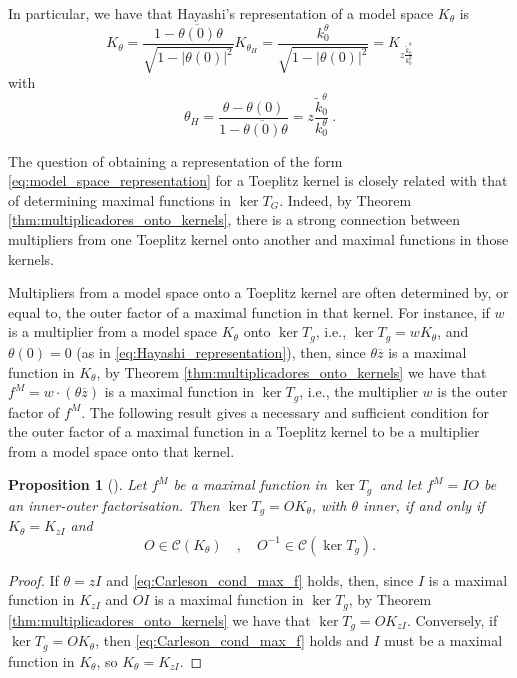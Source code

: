\documentclass{article}
\numberwithin{equation}{section}
\theoremstyle{plain}
\newtheorem{prop}[thm]{Proposition}
\newcommand{\CCC}{\ensuremath{\mathcal{C}}}
\newcommand{\ol}[1]{\ensuremath{\overline{#1}}}
\newcommand{\kertg}{\ensuremath{\ker T_g}}
\begin{document}
In particular, we have that Hayashi's representation of a model space $K_\theta$ is
\begin{equation}
\label{eq:Hayashi_repres_modelspace}
K_\theta = \frac{1 - \ol{ \theta (0) } \theta}{\sqrt{1 - |\theta(0)|^2}} K_{\theta_H} = \frac{k_0^\theta}{\sqrt{1 - |\theta(0)|^2}} = K_{z \frac{\tilde k^\theta_0}{k^\theta_0}}
\end{equation}
with 
\begin{equation}
\theta_H = \frac{\theta - \theta(0)}{1 - \ol{ \theta (0) } \theta} = z \frac{\tilde k^\theta_0}{k^\theta_0}\ .
\end{equation}


The question of obtaining a representation of the form \eqref{eq:model_space_representation} for a Toeplitz kernel is closely related with that of determining maximal functions in $\ker T_G$. Indeed, by Theorem \ref{thm:multiplicadores_onto_kernels}, there is a strong connection between multipliers from one Toeplitz kernel onto another and maximal functions in those kernels.


Multipliers from a model space onto a Toeplitz kernel are often determined by, or equal to, the outer factor of a maximal function in that kernel.
For instance, if $w$ is a multiplier from a model space $K_\theta$ onto \kertg, i.e., $\kertg = w K_\theta$, and $\theta(0) =0$ (as in \eqref{eq:Hayashi_representation}), then, since $\theta \ol z$ is a maximal function in $K_\theta$, by Theorem \ref{thm:multiplicadores_onto_kernels} we have that $f^M = w \cdot (\theta \ol z)$ is a maximal function in \kertg, i.e., the multiplier $w$ is the outer factor of $f^M$.
The following result gives a necessary and sufficient condition for the outer factor of a maximal function in a Toeplitz kernel to be a multiplier from a model space onto that kernel.


\begin{prop}[{\cite{CCD25}}]
\label{prop:multiplier_from_maximal_function}
Let $f^M$ be a maximal function in \kertg\ and let $f^M = IO$ be an inner-outer factorisation.
Then $\kertg = O K_\theta$, with $\theta$ inner, if and only if $K_\theta = K_{zI}$ and
\begin{equation}
\label{eq:Carleson_cond_max_f}
O \in \CCC (K_\theta) \quad , \quad O^{-1} \in \CCC (\kertg).
\end{equation}
\end{prop}


\begin{proof}
If $\theta = zI$ and \eqref{eq:Carleson_cond_max_f} holds, then, since $I$ is a maximal function in $K_{zI}$ and $OI$ is a maximal function in \kertg, by Theorem \ref{thm:multiplicadores_onto_kernels} we have that $\kertg = O K_{zI}$.
Conversely, if $\kertg = O K_\theta$, then \eqref{eq:Carleson_cond_max_f} holds and $I$ must be a maximal function in $K_\theta$, so $K_\theta = K_{zI}$.
\end{proof}
\end{document}
